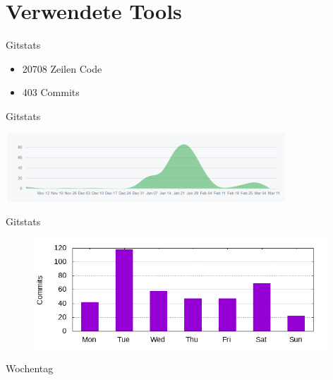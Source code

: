 \documentclass[11pt, usepdftitle=false,...]{beamer}
\begin{document}
	\frame{\sectionpage}
	
	
	\section{Verwendete Tools}
	\frame{\sectionpage}
	
	\begin{frame}{Gitstats}
	    \begin{itemize}
	        \item 20708 Zeilen Code
	        \item 403 Commits
	    \end{itemize}
	\end{frame}
	
	\begin{frame}{Gitstats}

                    \centering
                    \tiny
 					\includegraphics[width=10.5cm]{images/PSE_Commits.PNG}


	\end{frame}
	
	\begin{frame}{Gitstats}
	    \begin{figure}[ht] 
					\centering
					\includegraphics[width=11cm]{images/day_of_week.png}
				\end{figure}
					\small\centering Wochentag
	\end{frame}
	
\end{document}
